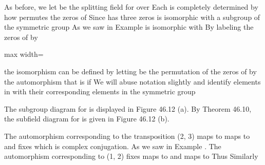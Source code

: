 \documentclass[11pt,oneside]{article}
\begin{document}
\begin{BookBody}
 As before, we let  be the splitting field for  over  Each  is completely determined by how \BookInline{\sigma } permutes the zeros of  Since  has three zeros is isomorphic with a subgroup of the symmetric group  As we saw in Example  is isomorphic with  By labeling the zeros of  by

\begin{center}\begin{adjustbox}{max width=\linewidth}\end{adjustbox}\end{center}

\noindent the isomorphism  can be defined by letting \BookInline{\phi (\sigma )} be the permutation of the zeros of  by the automorphism \BookInline{\sigma,\allowbreak } that is if  We will abuse notation slightly and identify elements in  with their corresponding elements in the symmetric group 

The subgroup diagram for  is displayed in Figure 46.12 (a). By Theorem 46.10, the subfield diagram for  is given in Figure 46.12 (b).

The automorphism corresponding to the transposition (2, 3) maps  to  maps  to  and fixes  which is complex conjugation. As we saw in Example  . The automorphism corresponding to (1, 2) fixes  maps  to  and maps  to  Thus  Similarly


\end{BookBody}
\end{document}
